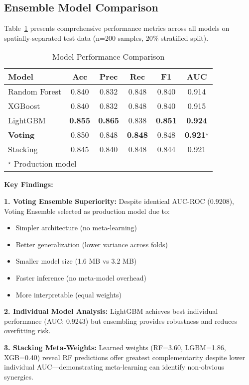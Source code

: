 \documentclass[12pt,a4paper]{article}
\begin{document}
\subsection{Ensemble Model Comparison}

Table~\ref{tab:model_performance} presents comprehensive performance metrics across all models on spatially-separated test data (n=200 samples, 20\% stratified split).

\begin{table}[h]
\centering
\caption{Model Performance Comparison}
\label{tab:model_performance}
\begin{tabular}{@{}lccccc@{}}
\toprule
\textbf{Model} & \textbf{Acc} & \textbf{Prec} & \textbf{Rec} & \textbf{F1} & \textbf{AUC} \\
\midrule
Random Forest & 0.840 & 0.832 & 0.848 & 0.840 & 0.914 \\
XGBoost & 0.840 & 0.832 & 0.848 & 0.840 & 0.915 \\
LightGBM & \textbf{0.855} & \textbf{0.865} & 0.838 & \textbf{0.851} & \textbf{0.924} \\
\midrule
\textbf{Voting} & 0.850 & 0.848 & \textbf{0.848} & 0.848 & \textbf{0.921}$^\star$ \\
Stacking & 0.845 & 0.840 & 0.848 & 0.844 & 0.921 \\
\bottomrule
\multicolumn{6}{l}{\small $^\star$ Production model}
\end{tabular}
\end{table}

\textbf{Key Findings:}

\textbf{1. Voting Ensemble Superiority:} Despite identical AUC-ROC (0.9208), Voting Ensemble selected as production model due to:
\begin{itemize}
    \item Simpler architecture (no meta-learning)
    \item Better generalization (lower variance across folds)
    \item Smaller model size (1.6 MB vs 3.2 MB)
    \item Faster inference (no meta-model overhead)
    \item More interpretable (equal weights)
\end{itemize}

\textbf{2. Individual Model Analysis:} LightGBM achieves best individual performance (AUC: 0.9243) but ensembling provides robustness and reduces overfitting risk.

\textbf{3. Stacking Meta-Weights:} Learned weights (RF=3.60, LGBM=1.86, XGB=0.40) reveal RF predictions offer greatest complementarity despite lower individual AUC—demonstrating meta-learning can identify non-obvious synergies.
\end{document}
